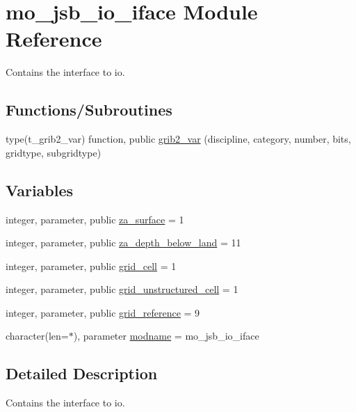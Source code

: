\hypertarget{namespacemo__jsb__io__iface}{}\section{mo\+\_\+jsb\+\_\+io\+\_\+iface Module Reference}
\label{namespacemo__jsb__io__iface}


Contains the interface to io.  


\subsection*{Functions/\+Subroutines}
\begin{DoxyCompactItemize}
\item 
type(t\+\_\+grib2\+\_\+var) function, public \hyperlink{namespacemo__jsb__io__iface_a7dcb7e7f110b47d470552f4961b9f07d}{grib2\+\_\+var} (discipline, category, number, bits, gridtype, subgridtype)
\end{DoxyCompactItemize}
\subsection*{Variables}
\begin{DoxyCompactItemize}
\item 
integer, parameter, public \hyperlink{namespacemo__jsb__io__iface_ab7d5e02770372d76b4e849aad1df02c6}{za\+\_\+surface} = 1
\item 
integer, parameter, public \hyperlink{namespacemo__jsb__io__iface_a79c0041a5e9568c7cb97d79f478ce461}{za\+\_\+depth\+\_\+below\+\_\+land} = 11
\item 
integer, parameter, public \hyperlink{namespacemo__jsb__io__iface_a30ebf996cc621d7f8ecfa372b0e452c2}{grid\+\_\+cell} = 1
\item 
integer, parameter, public \hyperlink{namespacemo__jsb__io__iface_a4923bf314c5fffee744c897b5d7b82ae}{grid\+\_\+unstructured\+\_\+cell} = 1
\item 
integer, parameter, public \hyperlink{namespacemo__jsb__io__iface_aadac9f6eb4b6f2ac600ea3c0eabe6a93}{grid\+\_\+reference} = 9
\item 
character(len=$\ast$), parameter \hyperlink{namespacemo__jsb__io__iface_aba3d7fda335dca67008e7972403aebf6}{modname} = \textquotesingle{}mo\+\_\+jsb\+\_\+io\+\_\+iface\textquotesingle{}
\end{DoxyCompactItemize}


\subsection{Detailed Description}
Contains the interface to io. 

